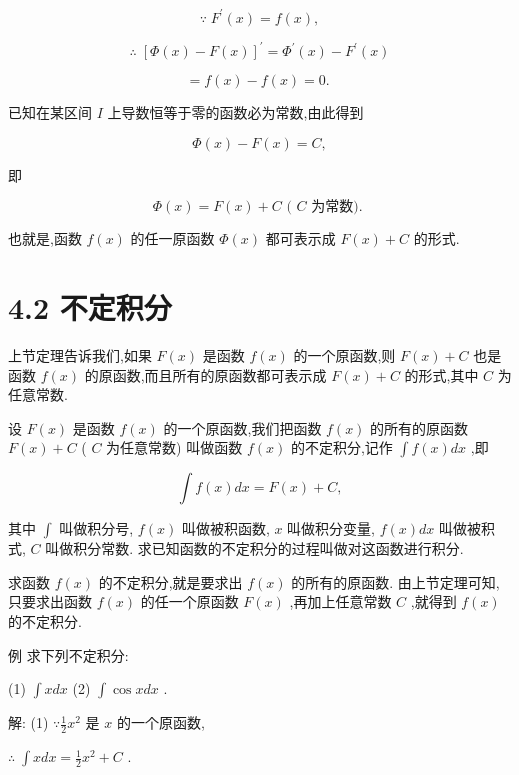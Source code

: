 \documentclass[10pt]{article}
\begin{document}
\[
\because \;{F}^{\prime }\left( x\right) = f\left( x\right) ,
\]

\[
\therefore \;{\left\lbrack \Phi \left( x\right) - F\left( x\right) \right\rbrack }^{\prime } = {\Phi }^{\prime }\left( x\right) - {F}^{\prime }\left( x\right)
\]

\[
= f\left( x\right) - f\left( x\right) = 0\text{. }
\]

已知在某区间 \(I\) 上导数恒等于零的函数必为常数,由此得到

\[
\Phi \left( x\right) - F\left( x\right) = C,
\]

即

\[
\Phi \left( x\right) = F\left( x\right) + C\text{ ( }C\text{ 为常数). }
\]

也就是,函数 \(f\left( x\right)\) 的任一原函数 \(\Phi \left( x\right)\) 都可表示成 \(F\left( x\right) + C\) 的形式.

\section*{4.2 不定积分}

上节定理告诉我们,如果 \(F\left( x\right)\) 是函数 \(f\left( x\right)\) 的一个原函数,则 \(F\left( x\right) + C\) 也是函数 \(f\left( x\right)\) 的原函数,而且所有的原函数都可表示成 \(F\left( x\right) + C\) 的形式,其中 \(C\) 为任意常数.

设 \(F\left( x\right)\) 是函数 \(f\left( x\right)\) 的一个原函数,我们把函数 \(f\left( x\right)\) 的所有的原函数 \(F\left( x\right) + C\) ( \(C\) 为任意常数) 叫做函数 \(f\left( x\right)\) 的不定积分,记作 \(\int f\left( x\right) {dx}\) ,即

\[
\int f\left( x\right) {dx} = F\left( x\right) + C,
\]

其中 \(\int\) 叫做积分号, \(f\left( x\right)\) 叫做被积函数, \(x\) 叫做积分变量, \(f\left( x\right) {dx}\) 叫做被积式, \(C\) 叫做积分常数. 求已知函数的不定积分的过程叫做对这函数进行积分.

求函数 \(f\left( x\right)\) 的不定积分,就是要求出 \(f\left( x\right)\) 的所有的原函数. 由上节定理可知,只要求出函数 \(f\left( x\right)\) 的任一个原函数 \(F\left( x\right)\) ,再加上任意常数 \(C\) ,就得到 \(f\left( x\right)\) 的不定积分.

例 求下列不定积分:

(1) \(\int {xdx}\) (2) \(\int \cos {xdx}\) .

解: (1) \(\because \frac{1}{2}{x}^{2}\) 是 \(x\) 的一个原函数,

\(\therefore \;\int {xdx} = \frac{1}{2}{x}^{2} + C\) .
\end{document}
